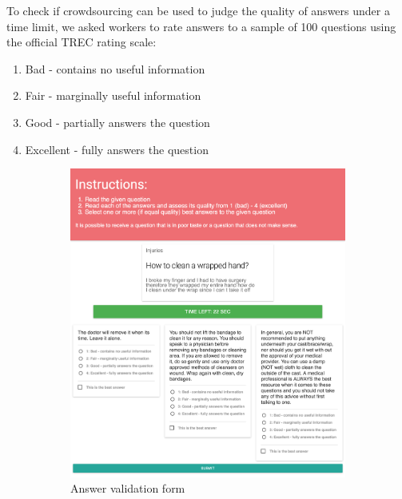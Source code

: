 To check if crowdsourcing can be used to judge the quality of answers under a time limit, we asked workers to rate answers to a sample of 100 questions using the official TREC rating scale:
\vspace{-0.3cm}
\begin{enumerate}
\setlength{\itemsep}{0pt}
\setlength{\parskip}{0pt}
\item Bad - contains no useful information
\item Fair - marginally useful information
\item Good - partially answers the question
\item Excellent - fully answers the question
\end{enumerate}

\begin{figure}[t!]
\centering
  \begin{subfigure}[b]{0.5\textwidth}
  \includegraphics[width=1.0\textwidth]{img/validation_screenshot}
  \caption{Answer validation form}
  \label{fig:non-factoid:crowd:interfaces:validation}
  \end{subfigure}
  \begin{subfigure}[b]{0.45\textwidth}
  \centering

\end{subfigure}
\end{figure}
